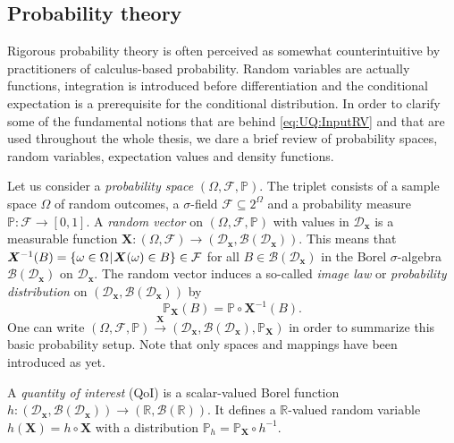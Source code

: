 \subsection{Probability theory}
Rigorous probability theory is often perceived as somewhat counterintuitive by practitioners of calculus-based probability.
Random variables are actually functions, integration is introduced before differentiation and the conditional expectation is a prerequisite for the conditional distribution.
In order to clarify some of the fundamental notions that are behind \cref{eq:UQ:InputRV} and that are used throughout the whole thesis,
we dare a brief review of probability spaces, random variables, expectation values and density functions.
\par %
Let us consider a \emph{probability space} \((\Omega, \mathcal{F}, \mathds{P})\).
The triplet consists of a sample space \(\Omega\) of random outcomes, a \(\sigma\)-field \(\mathcal{F} \subseteq 2^\Omega\)
and a probability measure \(\mathds{P} \colon \mathcal{F} \rightarrow [0,1]\).
A \emph{random vector} on \((\Omega, \mathcal{F}, \mathds{P})\) with values in \(\mathcal{D}_{\bm{x}}\) is a measurable function
\(\bm{X} \colon (\Omega, \mathcal{F}) \rightarrow (\mathcal{D}_{\bm{x}}, \mathcal{B}(\mathcal{D}_{\bm{x}}))\).
This means that \(\bm{X}^{-1}(B) = \{\omega \in \Omega {\:\!}|{\:\!} \bm{X}(\omega) \in B\} \in \mathcal{F}\)
for all \(B \in \mathcal{B}(\mathcal{D}_{\bm{x}})\) in the Borel \(\sigma\)-algebra \(\mathcal{B}(\mathcal{D}_{\bm{x}})\) on \(\mathcal{D}_{\bm{x}}\).
The random vector induces a so-called \emph{image law} or \emph{probability distribution} on \((\mathcal{D}_{\bm{x}}, \mathcal{B}(\mathcal{D}_{\bm{x}}))\) by
\begin{equation} \label{eq:UQ:ImageLaw}
  \mathds{P}_{\bm{X}}(B) = \mathds{P} \circ \bm{X}^{-1}(B).
\end{equation}
One can write \((\Omega, \mathcal{F}, \mathds{P}) \xrightarrow{\bm{X}} (\mathcal{D}_{\bm{x}}, \mathcal{B}(\mathcal{D}_{\bm{x}}), \mathds{P}_{\bm{X}})\)
in order to summarize this basic probability setup.
Note that only spaces and mappings have been introduced as yet.
\par %
A \emph{quantity of interest} (QoI) is a scalar-valued Borel function \(h \colon (\mathcal{D}_{\bm{x}}, \mathcal{B}(\mathcal{D}_{\bm{x}})) \rightarrow (\mathds{R},\mathcal{B}(\mathds{R}))\).
It defines a \(\mathds{R}\)-valued random variable \(h(\bm{X}) = h \circ \bm{X}\) with a distribution \(\mathds{P}_h = \mathds{P}_{\bm{X}} \circ h^{-1}\).
